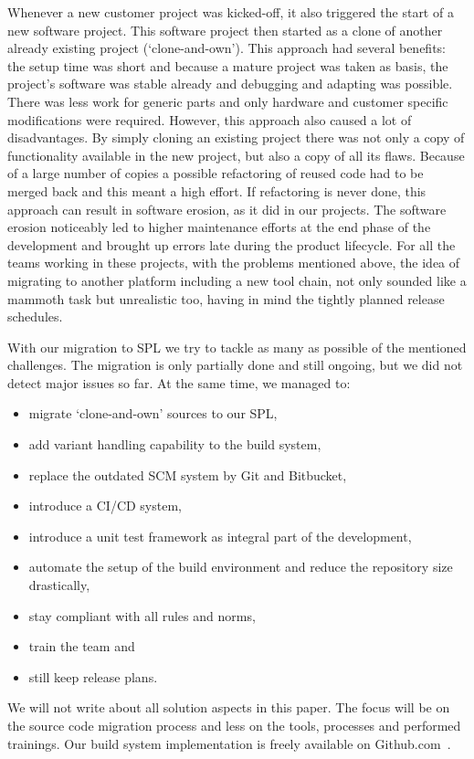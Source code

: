 Whenever a new customer project was kicked-off, it also triggered the start of a
new software project. This software project then started as a clone of another
already existing project (`clone-and-own'). This approach had several benefits:
the setup time was short and because a mature project was taken as basis, the
project's software was stable already and debugging and adapting was possible.
There was less work for generic parts and only hardware and customer specific
modifications were required. However, this approach also caused a lot of
disadvantages. By simply cloning an existing project there was not only a copy
of functionality available in the new project, but also a copy of all its flaws.
Because of a large number of copies a possible refactoring of reused code had to
be merged back and this meant a high effort. If refactoring is never done, this
approach can result in software erosion, as it did in our projects. The software
erosion noticeably led to higher maintenance efforts at the end phase of the
development and brought up errors late during the product lifecycle. For all the
teams working in these projects, with the problems mentioned above, the idea of
migrating to another platform including a new tool chain, not only sounded like
a mammoth task but unrealistic too, having in mind the tightly planned release
schedules.

With our migration to SPL we try to tackle as many as possible of the mentioned
challenges. The migration is only partially done and still ongoing, but we did
not detect major issues so far. At the same time, we managed to:
\begin{itemize}
  \item migrate `clone-and-own' sources to our SPL,
  \item add variant handling capability to the build system,
  \item replace the outdated SCM system by Git and Bitbucket,
  \item introduce a CI/CD system,
  \item introduce a unit test framework as integral part of the development,
  \item automate the setup of the build environment and reduce the repository size drastically,
  \item stay compliant with all rules and norms,
  \item train the team and
  \item still keep release plans.
\end{itemize}

We will not write about all solution aspects in this paper. The focus will be
on the source code migration process and less on the tools, processes and
performed trainings. Our build system implementation is freely available on
Github.com~\cite{GithubSPL}.
